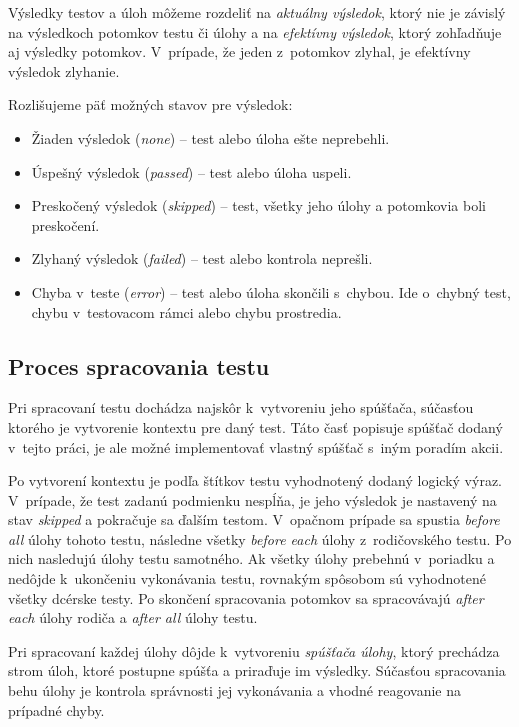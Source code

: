 \documentclass[
  digital, %
  oneside, %
  table,   %
  lof,     %
  lot,   %
]{fithesis3}
\begin{document}
Výsledky testov a úloh môžeme rozdeliť na \emph{aktuálny výsledok}, ktorý nie je závislý na výsledkoch potomkov testu či úlohy a na \emph{efektívny výsledok}, ktorý zohľadňuje aj výsledky potomkov. V~prípade, že jeden z~potomkov zlyhal, je efektívny výsledok zlyhanie.

Rozlišujeme päť možných stavov pre výsledok:
\begin{itemize}
    \item Žiaden výsledok (\emph{none}) -- test alebo úloha ešte neprebehli.
    \item Úspešný výsledok (\emph{passed}) -- test alebo úloha uspeli.
    \item Preskočený výsledok (\emph{skipped}) -- test, všetky jeho úlohy a potomkovia boli preskočení.
    \item Zlyhaný výsledok (\emph{failed}) -- test alebo kontrola neprešli.
    \item Chyba v~teste (\emph{error}) -- test alebo úloha skončili s~chybou. Ide o~chybný test, chybu v~testovacom rámci alebo chybu prostredia.
\end{itemize}

\subsection{Proces spracovania testu}
\label{design-runner}

Pri spracovaní testu dochádza najskôr k~vytvoreniu jeho spúšťača, súčasťou ktorého je vytvorenie kontextu pre daný test. Táto časť popisuje spúšťač dodaný v~tejto práci, je ale možné implementovať vlastný spúšťač s~iným poradím akcii. 

Po vytvorení kontextu je podľa štítkov testu vyhodnotený dodaný logický výraz. V~prípade, že test zadanú podmienku nespĺňa, je jeho výsledok je nastavený na stav \emph{skipped} a pokračuje sa ďalším testom. V~opačnom prípade sa spustia \emph{before all} úlohy tohoto testu, následne všetky \emph{before each} úlohy z~rodičovského testu. Po nich nasledujú úlohy testu samotného. Ak všetky úlohy prebehnú v~poriadku a nedôjde k~ukončeniu vykonávania testu, rovnakým spôsobom sú vyhodnotené všetky dcérske testy. Po skončení spracovania potomkov sa spracovávajú \emph{after each} úlohy rodiča a \emph{after all} úlohy testu.

Pri spracovaní každej úlohy dôjde k~vytvoreniu \emph{spúšťača úlohy}, ktorý prechádza strom úloh, ktoré postupne spúšťa a priraďuje im výsledky. Súčasťou spracovania behu úlohy je kontrola správnosti jej vykonávania a vhodné reagovanie na prípadné chyby.
\end{document}
